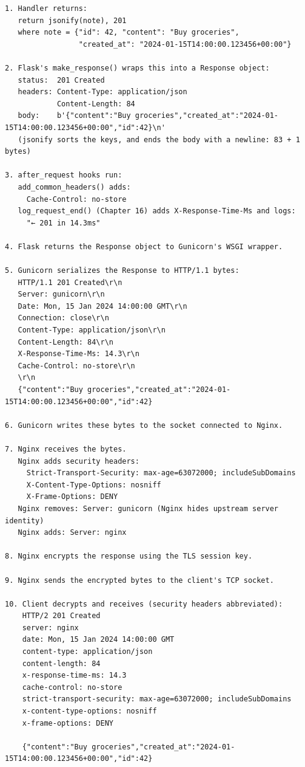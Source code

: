 \begin{outputbox}
\begin{Verbatim}[fontsize=\codesize, breaklines, breakanywhere, breaksymbolleft={\tiny\textcolor{muted}{$\hookrightarrow$}}]
1. Handler returns:
   return jsonify(note), 201
   where note = {"id": 42, "content": "Buy groceries",
                 "created_at": "2024-01-15T14:00:00.123456+00:00"}

2. Flask's make_response() wraps this into a Response object:
   status:  201 Created
   headers: Content-Type: application/json
            Content-Length: 84
   body:    b'{"content":"Buy groceries","created_at":"2024-01-15T14:00:00.123456+00:00","id":42}\n'
   (jsonify sorts the keys, and ends the body with a newline: 83 + 1 bytes)

3. after_request hooks run:
   add_common_headers() adds:
     Cache-Control: no-store
   log_request_end() (Chapter 16) adds X-Response-Time-Ms and logs:
     "← 201 in 14.3ms"

4. Flask returns the Response object to Gunicorn's WSGI wrapper.

5. Gunicorn serializes the Response to HTTP/1.1 bytes:
   HTTP/1.1 201 Created\r\n
   Server: gunicorn\r\n
   Date: Mon, 15 Jan 2024 14:00:00 GMT\r\n
   Connection: close\r\n
   Content-Type: application/json\r\n
   Content-Length: 84\r\n
   X-Response-Time-Ms: 14.3\r\n
   Cache-Control: no-store\r\n
   \r\n
   {"content":"Buy groceries","created_at":"2024-01-15T14:00:00.123456+00:00","id":42}

6. Gunicorn writes these bytes to the socket connected to Nginx.

7. Nginx receives the bytes.
   Nginx adds security headers:
     Strict-Transport-Security: max-age=63072000; includeSubDomains
     X-Content-Type-Options: nosniff
     X-Frame-Options: DENY
   Nginx removes: Server: gunicorn (Nginx hides upstream server identity)
   Nginx adds: Server: nginx

8. Nginx encrypts the response using the TLS session key.

9. Nginx sends the encrypted bytes to the client's TCP socket.

10. Client decrypts and receives (security headers abbreviated):
    HTTP/2 201 Created
    server: nginx
    date: Mon, 15 Jan 2024 14:00:00 GMT
    content-type: application/json
    content-length: 84
    x-response-time-ms: 14.3
    cache-control: no-store
    strict-transport-security: max-age=63072000; includeSubDomains
    x-content-type-options: nosniff
    x-frame-options: DENY

    {"content":"Buy groceries","created_at":"2024-01-15T14:00:00.123456+00:00","id":42}
\end{Verbatim}
\end{outputbox}

